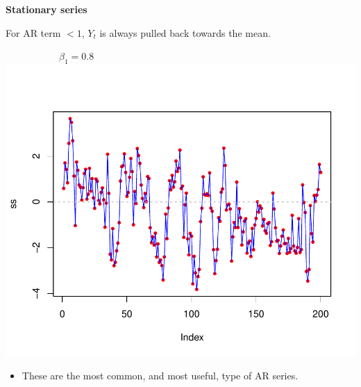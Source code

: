 \documentclass[12pt,xcolor=svgnames]{beamer}
\newcommand{\theme}{\color{FireBrick}}
\newcommand{\sk}{\vspace{.4cm}}
\newcommand{\chap}[1]{{\theme \Large \bf #1} \sk}
\begin{document}
\begin{frame}
\chap{Stationary series}

For AR term $<1$, $Y_t$ is always pulled back towards the mean.

\vspace{0.55cm}
\begin{minipage}{7cm}
\centering
\ \ \ \ \ \ \ \ \ \ \ $\beta_1 = 0.8$\\
\includegraphics[scale=0.55,trim=15 50 0 50]{stationary_new}
\sk
\end{minipage}\hfill
\begin{minipage}{3cm}
\begin{itemize}
\item These are the most common, and most useful, type of AR series.
\end{itemize}
\end{minipage}

\end{frame}
\end{document}

